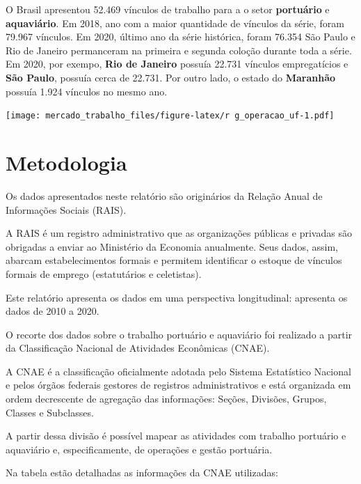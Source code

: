 \documentclass[
]{article}
\begin{document}
O Brasil apresentou 52.469 vínculos de trabalho para a o setor
\textbf{portuário} e \textbf{aquaviário}. Em 2018, ano com a maior
quantidade de vínculos da série, foram 79.967 vínculos. Em 2020, último
ano da série histórica, foram 76.354 São Paulo e Rio de Janeiro
permanceram na primeira e segunda coloção durante toda a série. Em 2020,
por exempo, \textbf{Rio de Janeiro} possuía 22.731 vínculos
empregatícios e \textbf{São Paulo}, possuía cerca de 22.731. Por outro
lado, o estado do \textbf{Maranhão} possuía 1.924 vínculos no mesmo ano.

\texttt{[image: mercado\_trabalho\_files/figure-latex/r g\_operacao\_uf-1.pdf]}

\hypertarget{metodologia}{%
\section{Metodologia}\label{metodologia}}

Os dados apresentados neste relatório são originários da Relação Anual
de Informações Sociais (RAIS).

A RAIS é um registro administrativo que as organizações públicas e
privadas são obrigadas a enviar ao Ministério da Economia anualmente.
Seus dados, assim, abarcam estabelecimentos formais e permitem
identificar o estoque de vínculos formais de emprego (estatutários e
celetistas).

Este relatório apresenta os dados em uma perspectiva longitudinal:
apresenta os dados de 2010 a 2020.

O recorte dos dados sobre o trabalho portuário e aquaviário foi
realizado a partir da Classificação Nacional de Atividades Econômicas
(CNAE).

A CNAE é a classificação oficialmente adotada pelo Sistema Estatístico
Nacional e pelos órgãos federais gestores de registros administrativos e
está organizada em ordem decrescente de agregação das informações:
Seções, Divisões, Grupos, Classes e Subclasses.

A partir dessa divisão é possível mapear as atividades com trabalho
portuário e aquaviário e, especificamente, de operações e gestão
portuária.

Na tabela estão detalhadas as informações da CNAE utilizadas:
\end{document}
